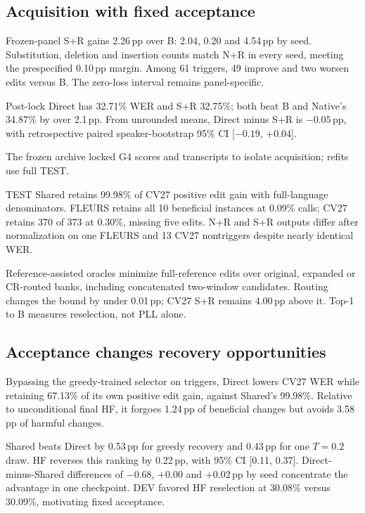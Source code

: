 \subsection{Acquisition with fixed acceptance}

Frozen-panel S+R gains 2.26\,pp over B: 2.04, 0.20 and 4.54\,pp by seed. Substitution, deletion and insertion counts match N+R in every seed, meeting the prespecified 0.10\,pp margin. Among 61 triggers, 49 improve and two worsen edits versus B. The zero-loss interval remains panel-specific.

Post-lock Direct has 32.71\% WER and S+R 32.75\%; both beat B and Native's 34.87\% by over 2.1\,pp. From unrounded means, Direct minus S+R is $-0.05$\,pp, with retrospective paired speaker-bootstrap 95\% CI [$-0.19$, $+0.04$].\par
\begin{samepage}
The frozen archive locked G4 scores and transcripts to isolate acquisition; refits use full TEST.\par
\end{samepage}

TEST Shared retains 99.98\% of CV27 positive edit gain with full-language denominators. FLEURS retains all 10 beneficial instances at 0.09\% calls; CV27 retains 370 of 373 at 0.30\%, missing five edits. N+R and S+R outputs differ after normalization on one FLEURS and 13 CV27 nontriggers despite nearly identical WER.

Reference-assisted oracles minimize full-reference edits over original, expanded or CR-routed banks, including concatenated two-window candidates. Routing changes the bound by under 0.01\,pp; CV27 S+R remains 4.00\,pp above it. Top-1 to B measures reselection, not PLL alone.

\subsection{Acceptance changes recovery opportunities}
Bypassing the greedy-trained selector on triggers, Direct lowers CV27 WER while retaining 67.13\% of its own positive edit gain, against Shared's 99.98\%. Relative to unconditional final HF, it forgoes 1.24\,pp of beneficial changes but avoids 3.58\,pp of harmful changes.

Shared beats Direct by 0.53\,pp for greedy recovery and 0.43\,pp for one $T=0.2$ draw. HF reverses this ranking by 0.22\,pp, with 95\% CI [0.11, 0.37]. Direct-minus-Shared differences of $-0.68$, $+0.00$ and $+0.02$\,pp by seed concentrate the advantage in one checkpoint. DEV favored HF reselection at 30.08\% versus 30.09\%, motivating fixed acceptance.


